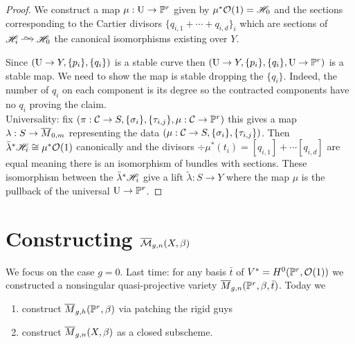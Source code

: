 \documentclass[12pt]{article}
\newcommand{\Mbar}{\ol{\M}}
\begin{document}
\begin{proof}
We construct a map $\mu : \mathrm{U} \to \mathbb{P}^r$ given by $\mu^* \mathcal{O}_{}(1) = \mathscr{H}_0$ and the sections corresponding to the Cartier divisors $\{ q_{i,1} + \cdots + q_{i,d} \}_{i}$ which are sections of $\H_i \iso \H_0$ the canonical isomorphisms existing over $Y$. 

Since $(\mathrm{U} \to Y, \{ p_i \}, \{ q_i \})$ is a stable curve then $(\mathrm{U} \to Y, \{ p_i \}, \{ q_i \}, \mathrm{U} \to \mathbb{P}^r)$ is a stable map. We need to show the map is stable dropping the $\{ q_i \}$. Indeed, the number of $q_i$ on each component is its degree so the contracted components have no $q_i$ proving the claim. 
\bigskip\\
Universality: fix $(\pi : \mathcal{C} \to S, \{ \sigma_i \}, \{ \tau_{i,j} \}, \mu : \mathcal{C} \to \mathbb{P}^r)$ this gives a map $\lambda : S \to \overline{M}_{0,m}$ representing the data $(\mu : \mathcal{C} \to S, \{ \sigma_i \}, \{ \tau_{i,j} \})$. Then $\bar{\lambda}^* \mathscr{H}_i \cong \mu^* \mathcal{O}_{}(1)$ canonically and the divisors $\div \mu^* (t_i) = [q_{i,1}] + \cdots [q_{i,d}]$ are equal meaning there is an isomorphism of bundles with sections. These isomorphism between the $\bar{\lambda}^* \mathscr{H}_i$ give a lift $\tilde{\lambda} : S \to Y$ where the map $\mu$ is the pullback of the universal $\mathrm{U} \to \mathbb{P}^r$. 
\end{proof}

\section{Constructing $\Mbar_{g,n}(X, \beta)$}

We focus on the case $g = 0$. Last time: for any basis $\bar{t}$ of $V^* = H^0(\mathbb{P}^r, \mathcal{O}_{}(1))$ we constructed a nonsingular quasi-projective variety $\overline{M}_{g,n}(\mathbb{P}^r, \beta, \bar{t})$. Today we
\begin{enumerate}
\item construct $\overline{M}_{g,h}(\mathbb{P}^r, \beta)$ via patching the rigid guys
\item construct $\overline{M}_{g,n}(X, \beta)$ as a closed subscheme. 
\end{enumerate}
\end{document}
